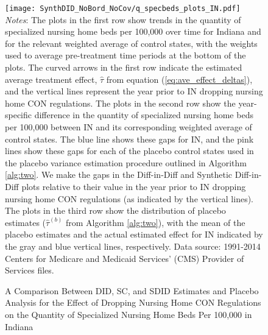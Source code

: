 \documentclass[../Main.tex]{subfiles}
\begin{document}
\newpage
{}
\begin{figure}[t] 
    \setlength{}
	\caption{\label{fig:q_specbeds_plots_in} \centering A Comparison Between DID, SC, and SDID Estimates and Placebo Analysis for the Effect of Dropping Nursing Home CON Regulations on the Quantity of Specialized Nursing Home Beds Per 100,000 in Indiana} {\centering\texttt{[image: SynthDID\_NoBord\_NoCov/q\_specbeds\_plots\_IN.pdf]}}
    \vspace{-1.4cm}\\
    \scriptsize
		\textit{Notes}: The plots in the first row show trends in the quantity of specialized nursing home beds per 100,000 over time for Indiana and for the relevant weighted average of control states, with the weights used to average pre-treatment time periods at the bottom of the plots. The curved arrows in the first row indicate the estimated average treatment effect, $\hat{\tau}$ from equation (\ref{eq:ave_effect_deltas}), and the vertical lines represent the year prior to IN dropping nursing home CON regulations. The plots in the second row show the year-specific difference in the quantity of specialized nursing home beds per 100,000 between IN and its corresponding weighted average of control states. The blue line shows these gaps for IN, and the pink lines show these gaps for each of the placebo control states used in the placebo variance estimation procedure outlined in Algorithm \ref{alg:two}. We make the gaps in the Diff-in-Diff and Synthetic Diff-in-Diff plots relative to their value in the year prior to IN dropping nursing home CON regulations (as indicated by the vertical lines). The plots in the third row show the distribution of placebo estimates ($\hat{\tau}^{(b)}$ from Algorithm \ref{alg:two}), with the mean of the placebo estimates and the actual estimated effect for IN indicated by the gray and blue vertical lines, respectively. Data source: 1991-2014 Centers for Medicare and Medicaid Services’ (CMS) Provider of Services files.
\end{figure}
\restoregeometry
\clearpage
\end{document}
